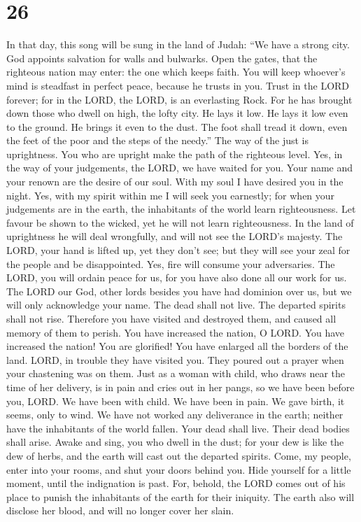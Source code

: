 \hypertarget{section-25}{%
\section{26}\label{section-25}}

 In that day, this song will be sung in the land of Judah:
``We have a strong city. God appoints salvation for walls and bulwarks.
 Open the gates, that the righteous nation may enter: the
one which keeps faith.  You will keep whoever's mind is
steadfast in perfect peace, because he trusts in you.  Trust
in the LORD forever; for in the LORD, the LORD, is an everlasting Rock.
 For he has brought down those who dwell on high, the lofty
city. He lays it low. He lays it low even to the ground. He brings it
even to the dust.  The foot shall tread it down, even the
feet of the poor and the steps of the needy.''  The way of
the just is uprightness. You who are upright make the path of the
righteous level.  Yes, in the way of your judgements, the
LORD, we have waited for you. Your name and your renown are the desire
of our soul.  With my soul I have desired you in the night.
Yes, with my spirit within me I will seek you earnestly; for when your
judgements are in the earth, the inhabitants of the world learn
righteousness.  Let favour be shown to the wicked, yet he
will not learn righteousness. In the land of uprightness he will deal
wrongfully, and will not see the LORD's majesty.  The LORD,
your hand is lifted up, yet they don't see; but they will see your zeal
for the people and be disappointed. Yes, fire will consume your
adversaries.  The LORD, you will ordain peace for us, for
you have also done all our work for us.  The LORD our God,
other lords besides you have had dominion over us, but we will only
acknowledge your name.  The dead shall not live. The
departed spirits shall not rise. Therefore you have visited and
destroyed them, and caused all memory of them to perish. 
You have increased the nation, O LORD. You have increased the nation!
You are glorified! You have enlarged all the borders of the land.
 LORD, in trouble they have visited you. They poured out a
prayer when your chastening was on them.  Just as a woman
with child, who draws near the time of her delivery, is in pain and
cries out in her pangs, so we have been before you, LORD. 
We have been with child. We have been in pain. We gave birth, it seems,
only to wind. We have not worked any deliverance in the earth; neither
have the inhabitants of the world fallen.  Your dead shall
live. Their dead bodies shall arise. Awake and sing, you who dwell in
the dust; for your dew is like the dew of herbs, and the earth will cast
out the departed spirits.  Come, my people, enter into your
rooms, and shut your doors behind you. Hide yourself for a little
moment, until the indignation is past.  For, behold, the
LORD comes out of his place to punish the inhabitants of the earth for
their iniquity. The earth also will disclose her blood, and will no
longer cover her slain.

